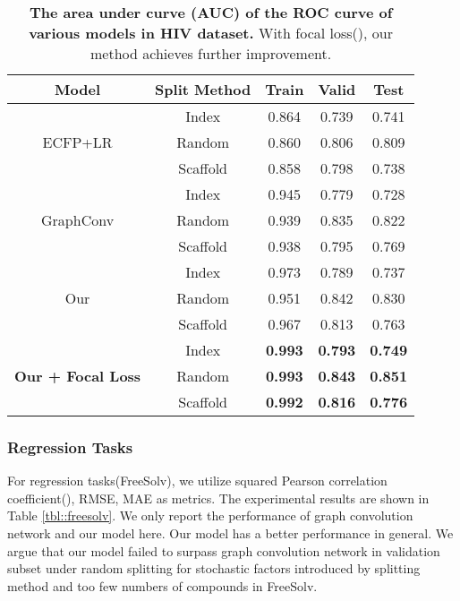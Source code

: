 \documentclass[letterpaper]{article} \usepackage{aaai18}  \usepackage{times}  \usepackage{helvet}  \usepackage{courier}  \usepackage{url}  \usepackage{graphicx}  \usepackage{amsmath}
\begin{document}
\begin{table}[!h]
\caption{\textbf{The area under curve (AUC) of the ROC curve of various models in HIV dataset.} With focal loss(), our method achieves further improvement.}
\label{tbl::hiv}
\vskip 0.15in
\begin{center}
\begin{small}
\begin{tabular}{|c|c|c|c|c|}
\hline
Model                               & Split Method    & Train         &Valid         & Test \\
\hline
\multirow{3}{*}{ECFP+LR}           & Index      &   0.864       &   0.739      &   0.741  \\
                                   & Random     &   0.860       &   0.806      &   0.809  \\
                                   & Scaffold   &   0.858       &   0.798      &   0.738  \\
\hline
\multirow{3}{*}{GraphConv}         & Index      &   0.945       &   0.779      &   0.728  \\
                                   & Random     &   0.939       &   0.835      &   0.822  \\
                                   & Scaffold   &   0.938       &   0.795      &   0.769  \\
\hline
\multirow{3}{*}{Our}               & Index      &   0.973       &   0.789       &   0.737\\
                                   & Random     &   0.951       &   0.842       &   0.830\\
                                   & Scaffold   &   0.967       &   0.813       &   0.763       \\  
\hline
\multirow{3}{*}{\textbf{Our + Focal Loss}}  & Index      &\textbf{0.993} &\textbf{0.793} &\textbf{0.749}\\
                                   & Random     &\textbf{0.993} &\textbf{0.843} &\textbf{0.851}\\
                                   & Scaffold   &\textbf{0.992} &\textbf{0.816} &\textbf{0.776}\\                                    
\hline
\end{tabular}
\end{small}
\end{center}
\vskip -0.1in
\end{table}

\subsubsection{Regression Tasks} For regression tasks(FreeSolv), we utilize squared Pearson correlation coefficient(), RMSE, MAE as metrics. The experimental results are shown in Table \ref{tbl::freesolv}. We only report the performance of graph convolution network and our model here. Our model has a better performance in general. We argue that our model failed to surpass graph convolution network in validation subset under random splitting for stochastic factors introduced by splitting method and too few numbers of compounds in FreeSolv.
\end{document}
